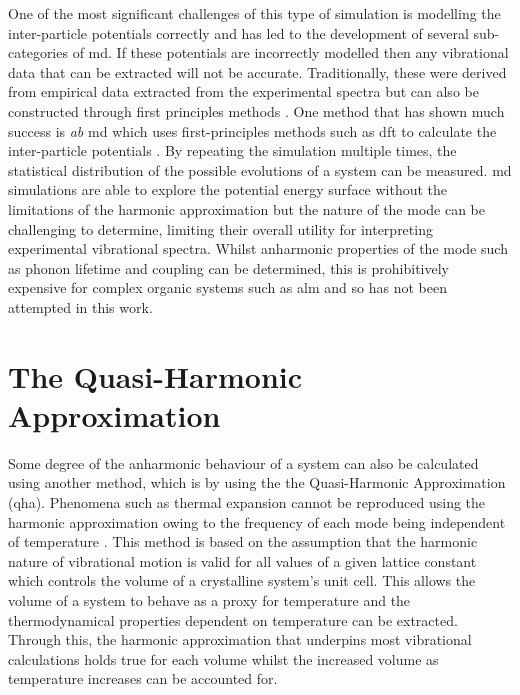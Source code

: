 One of the most significant challenges of this type of simulation is modelling the inter\nobreakdash-particle potentials correctly and has led to the development of several sub\nobreakdash-categories of \acrshort{md}. If these potentials are incorrectly modelled then any vibrational data that can be extracted will not be accurate. Traditionally, these were derived from empirical data extracted from the experimental spectra \DIFdelbegin \DIFdel{~}\DIFdelend \cite{Thakur1998, Haas1995, Miller2004} but can also be constructed through first principles methods  \DIFdelbegin \DIFdel{~}\DIFdelend \cite{Wang2020}. One method that has shown much success is \textit{ab\DIFdelbegin {}\DIFdelend \DIFaddbegin \nobreakdash{}\DIFaddend } \acrshort{md} \DIFdelbegin \DIFdel{~}\DIFdelend \cite{Car2005} which uses first\nobreakdash-principles methods such as \acrshort{dft} to calculate the inter\nobreakdash-particle potentials \DIFdelbegin \DIFdel{~}\DIFdelend \cite{Gai1998}. By repeating the simulation multiple times, the statistical distribution of the possible evolutions of a system can be measured. \acrshort{md} simulations are able to explore the potential energy surface without the limitations of the harmonic approximation but the nature of the mode can be challenging to determine, limiting their overall utility for interpreting experimental vibrational spectra. Whilst anharmonic properties of the mode such as phonon lifetime and coupling can be determined, this is prohibitively expensive for complex organic systems such as \acrshort{alm} and so has not been attempted in this work.

\section{The Quasi-Harmonic Approximation}
 Some degree of the anharmonic behaviour of a system can also be calculated using another method, which is by using the the Quasi\nobreakdash-Harmonic Approximation (\acrshort{qha}). Phenomena such as thermal expansion cannot be reproduced using the harmonic approximation owing to the frequency of each mode being independent of temperature \DIFdelbegin \DIFdel{~}\DIFdelend \cite{yatsyshyn2015handbook}. This method is based on the assumption that the harmonic nature of vibrational motion is valid for all values of a given lattice constant which controls the volume of a crystalline system's unit cell. This allows the volume of a system to behave as a proxy for temperature and the thermodynamical properties dependent on temperature can be extracted. Through this, the harmonic approximation that underpins most vibrational calculations holds true for each volume whilst the increased volume as temperature increases can be accounted for. 

